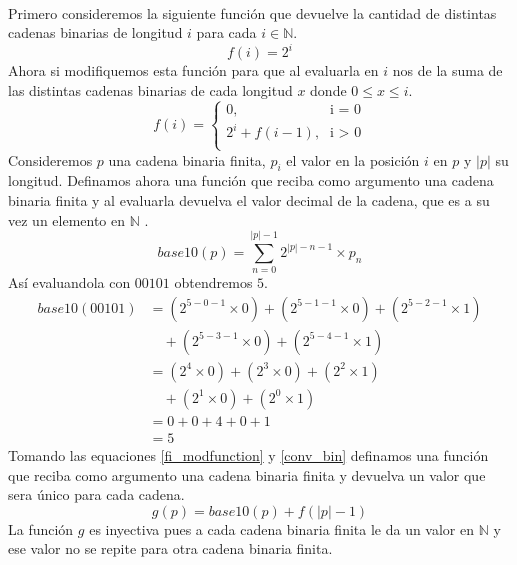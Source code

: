 \documentclass[12pt]{article}
\begin{document}
\paragraph{}
Primero consideremos la siguiente función que devuelve  la cantidad de distintas cadenas binarias de longitud $i$ para cada $i\in\mathbb{N}$.
\begin{equation}\label{fi_function}
f(i)=2^{i} 
\end{equation}
Ahora si modifiquemos esta función para que al evaluarla en $i$ nos de la suma de las distintas cadenas binarias de cada longitud $x$ donde $0 \leq x \leq i$.
\begin{equation}\label{fi_modfunction}
f(i) = 
\begin{cases}
\text{0,} &\text{i = 0}\\
\text{$2^{i}  + f(i - 1)$,} &\text{i $>$ 0} \\
\end{cases}
\end{equation}
Consideremos $p$ una cadena binaria finita, $p_{i}$ el valor en la posición $i$ en $p$ y $|p|$ su longitud. Definamos ahora una función que reciba como argumento una cadena binaria finita y al evaluarla devuelva el valor decimal de la cadena, que es a su vez un elemento en  $\mathbb{N}$ .
\begin{equation}\label{conv_bin}
base10(p) = \sum_{n=0}^{|p| - 1} 2^{|p| - n - 1} \times p_{n}
\end{equation}
Así evaluandola con $00101$ obtendremos $5$.
\begin{equation}\label{conv_bin_demo}
\begin{split}
base10(00101) & = (2^{5 - 0 - 1} \times 0) + (2^{5 - 1- 1} \times 0) + (2^{5 - 2- 1} \times 1) \\  &\quad+ (2^{5 - 3- 1} \times 0) + (2^{5 - 4- 1} \times 1) \\
& = (2^{4} \times 0) + (2^{3} \times 0) + (2^{2} \times 1)\\  &\quad+ (2^{1} \times 0) + (2^{0} \times 1)\\
& = 0 + 0 + 4 + 0 + 1 \\
& = 5
\end{split}
\end{equation}
Tomando las equaciones \ref{fi_modfunction} y \ref{conv_bin} definamos una función que reciba como argumento una cadena binaria finita y devuelva un valor que sera único para cada cadena.
\begin{equation}\label{enumerate_cad}
g(p) = base10(p) + f(|p| - 1)
\end{equation}
La función $g$ es inyectiva pues a cada cadena binaria finita le da un valor en  $\mathbb{N}$  y ese valor no se repite para otra cadena binaria finita. 
\end{document}
